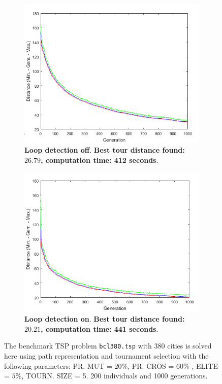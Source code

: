    \begin{figure}[!]
\centering
\begin{subfigure}{0.45\textwidth}
  \centering
  \includegraphics[width=1\textwidth]{../figures/question_5/tournament_off_gen.png}
      \caption{\textbf{Loop detection off}. \textbf{Best tour distance found: $\mathbf{26.79}$, computation time: 412 seconds}. } 
      \label{fig:tourn_vraag5_off_gen}
\end{subfigure}
\hspace{0.05\textwidth}
\begin{subfigure}{0.45\textwidth}
  \centering
  \includegraphics[width=1\textwidth]{../figures/question_5/tournament_on_on.png}
      \caption{\textbf{Loop detection on}.  \textbf{Best tour distance found: $\mathbf{20.21}$, computation time: 441 seconds}.} 
      \label{fig:tourn_vraag5_off_gen}
\end{subfigure}
\caption{The benchmark TSP problem \texttt{bcl380.tsp} with 380 cities is solved here using path representation and tournament selection with the following parameters: PR. MUT = $20\%$, PR. CROS = $60\%$ , ELITE = $5\%$, TOURN. SIZE = 5. 200 individuals and 1000 generations.}
\label{fig:tour_gen}
\end{figure}


